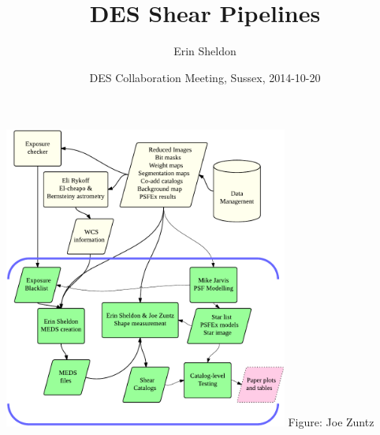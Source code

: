 \documentclass{beamer}
\begin{document}


\title{DES Shear Pipelines}
\author{Erin Sheldon}
\date{DES Collaboration Meeting, Sussex, 2014-10-20 }

\frame{\titlepage}

\frame
{
    \begin{center}
        \includegraphics[width=0.7\textwidth]{flowchart-crop.pdf}
        \newline
        {\tiny Figure: Joe Zuntz}
    \end{center}
}
\end{document}
